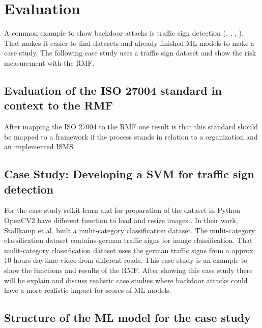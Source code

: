 \section{Evaluation}
\label{sec:evaluation}

A common example to show backdoor attacks is traffic sign detection (\cite{DBLP:journals/corr/abs-2102-10369}, \cite{DBLP:journals/corr/abs-1708-06733}, \cite{DBLP:conf/codaspy/NudingM20}, \cite{DBLP:journals/tdsc/LiXZZZ21}). That makes it easier to find datasets and already finished ML models to make a case study. The following case study uses a traffic sign dataset and show the risk measurement with the RMF.

\subsection{Evaluation of the ISO 27004 standard in context to the RMF}

After mapping the ISO 27004 to the RMF one result is that this standard should be mapped to a framework if the process stands in relation to a organization and an implemented ISMS.

\subsection{Case Study: Developing a SVM for traffic sign detection}

For the case study scikit-learn \cite{scikit-learn} and for preparation of the dataset in Python OpenCV2 have different function to load and resize images \cite{opencv_library}. In their work, Stallkamp et al. \cite{DBLP:conf/ijcnn/StallkampSSI11} built a mulit-category classification dataset. The mulit-category classification dataset contains german traffic signs for image classification. That mulit-category classification dataset uses the german traffic signs from a approx. 10 hours daytime video from different roads.
This case study is an example to show the functions and results of the RMF. After showing this case study there will be explain and discuss realistic case studies where backdoor attacks could have a more realistic impact for scores of ML models.

\subsection{Structure of the ML model for the case study}

